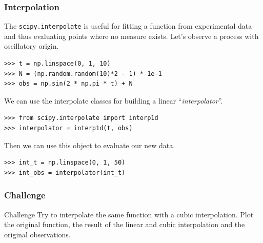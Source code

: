 \documentclass[10pt,colorlinks]{beamer}
\begin{document}
\begin{frame}[fragile]\frametitle{Interpolation}
The \verb|scipy.interpolate| is useful for fitting a function from experimental data and thus evaluating points where no measure exists.
Let's observe a process with oscillatory origin.
\begin{verbatim}
>>> t = np.linspace(0, 1, 10)
>>> N = (np.random.random(10)*2 - 1) * 1e-1
>>> obs = np.sin(2 * np.pi * t) + N
\end{verbatim}

We can use the interpolate classes for building a linear ``\emph{interpolator}''.


\begin{verbatim}
>>> from scipy.interpolate import interp1d
>>> interpolator = interp1d(t, obs)
\end{verbatim}

Then we can use this object to evaluate our new data. 
\begin{verbatim}
>>> int_t = np.linspace(0, 1, 50)
>>> int_obs = interpolator(int_t)
\end{verbatim}

\end{frame}
\begin{frame}[fragile]\frametitle{Challenge}
  \begin{block}{Challenge}
  Try to interpolate the same function with a cubic interpolation. Plot the original function, the result of the linear and cubic interpolation and the original observations.  
  \end{block}
\end{frame}
\end{document}
